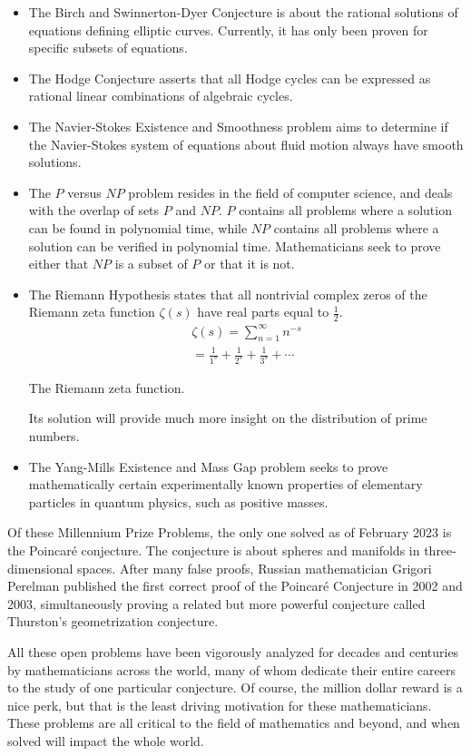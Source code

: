 \documentclass{article}
\begin{document}
\begin{multicols}{3}
\begin{itemize}
    \item The Birch and Swinnerton-Dyer Conjecture is about the rational solutions of equations defining elliptic curves. Currently, it has only been proven for specific subsets of equations.
    \item The Hodge Conjecture asserts that all Hodge cycles can be expressed as rational linear combinations of algebraic cycles.
    \item The Navier-Stokes Existence and Smoothness problem aims to determine if the Navier-Stokes system of equations about fluid motion always have smooth solutions.
    \item The $P$ versus $NP$ problem resides in the field of computer science, and deals with the overlap of sets $P$ and $NP$. $P$ contains all problems where a solution can be found in polynomial time, while $NP$ contains all problems where a solution can be verified in polynomial time. Mathematicians seek to prove either that $NP$ is a subset of $P$ or that it is not.
    \item The Riemann Hypothesis states that all nontrivial complex zeros of the Riemann zeta function $\zeta(s)$ have real parts equal to $\frac12$. 
    \begin{multline*}
    \zeta(s)=\sum_{n=1}^{\infty}n^{-s} \\
    =\frac1{1^s}+\frac1{2^s}+\frac1{3^s}+\cdots
    \end{multline*}
    \begin{center}
        \footnotesize
        The Riemann zeta function.
    \end{center}
    Its solution will provide much more insight on the distribution of prime numbers.
    \item The Yang-Mills Existence and Mass Gap problem seeks to prove mathematically certain experimentally known properties of elementary particles in quantum physics, such as positive masses.
\end{itemize}
Of these Millennium Prize Problems, the only one solved as of February 2023 is the Poincar\'e conjecture. The conjecture is about spheres and manifolds in three-dimensional spaces. After many false proofs, Russian mathematician Grigori Perelman published the first correct proof of the Poincar\'e Conjecture in 2002 and 2003, simultaneously proving a related but more powerful conjecture called Thurston's geometrization conjecture.

All these open problems have been vigorously analyzed for decades and centuries by mathematicians across the world, many of whom dedicate their entire careers to the study of one particular conjecture. Of course, the million dollar reward is a nice perk, but that is the least driving motivation for these mathematicians. These problems are all critical to the field of mathematics and beyond, and when solved will impact the whole world.
\closearticle




\end{multicols}
\end{document}
